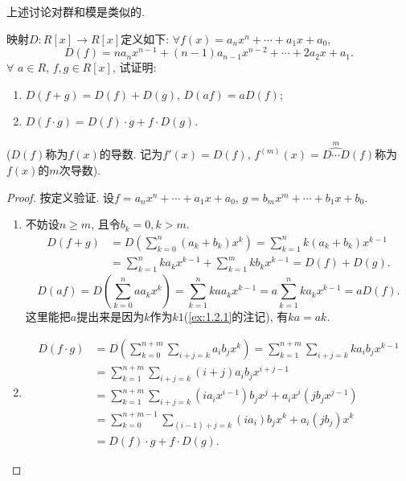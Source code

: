 \begin{remark}
    上述讨论对群和模是类似的.
\end{remark}

\begin{problem}\label{ex:2.1.9}
    映射$D:R[x] \longrightarrow R[x]$定义如下: $\forall f(x) = a_nx^n + \cdots + a_1x + a_0$,
    \[
        D(f) = na_nx^{n - 1} + (n - 1)a_{n - 1}x^{n - 2} + \cdots + 2a_2x + a_1.
    \]
    $\forall$ $a \in R$, $f, g \in R[x]$, 试证明:
    \begin{enumerate}[(1)]
        \item $D(f + g) = D(f) + D(g)$, $D(af) = aD(f)$;
        \item $D(f \cdot g) = D(f) \cdot g + f \cdot D(g)$.
    \end{enumerate}
    ($D(f)$称为$f(x)$的导数. 记为$f'(x) = D(f),\, f^{(m)}(x) = \overset{m}{\widehat{D \cdots D}}(f)$称为$f(x)$的$m$次导数).
\end{problem}

\begin{proof}
    按定义验证. 设$f = a_nx^n + \cdots + a_1x + a_0$, $g = b_mx^m + \cdots + b_1x + b_0$.
    \begin{enumerate}[(1)]
        \item 不妨设$n \geqslant m$, 且令$b_k = 0, k > m$.
        \[
        \begin{aligned}
            D(f + g) &= D\left(\sum_{k = 0}^{n} (a_k + b_k)x^k\right) = \sum_{k = 1}^{n} k(a_k + b_k)x^{k - 1}\\ 
            &= \sum_{k = 1}^{n} ka_kx^{k - 1} + \sum_{k = 1}^{m} kb_kx^{k - 1} = D(f) + D(g).
        \end{aligned}
        \]
        \[
            D(af) = D\left(\sum_{k = 0}^{n} aa_kx^k\right) = \sum_{k = 1}^{n} kaa_kx^{k - 1} = a\sum_{k = 1}^{n} ka_kx^{k - 1} = aD(f).
        \]
        这里能把$a$提出来是因为$k$作为$k1$(\ref{ex:1.2.1}的注记), 有$ka = ak$.
        \item 
        \[
        \begin{aligned}
            D(f \cdot g) &= D\left(\sum_{k = 0}^{n + m} \sum_{i + j = k} a_ib_jx^k\right) = \sum_{k = 1}^{n + m} \sum_{i + j = k} ka_ib_jx^{k - 1}\\
            &= \sum_{k = 1}^{n + m} \sum_{i + j = k} (i + j)a_ib_jx^{i + j - 1}\\
            &= \sum_{k = 1}^{n + m} \sum_{i + j = k} (ia_ix^{i - 1})b_jx^j + a_ix^i(jb_jx^{j - 1})\\
            &= \sum_{k = 0}^{n + m - 1} \sum_{(i - 1) + j = k} (ia_i)b_jx^{k} + a_i(jb_j)x^k\\
            &= D(f) \cdot g + f \cdot D(g).
        \end{aligned}
        \]
    \end{enumerate}
\end{proof}

